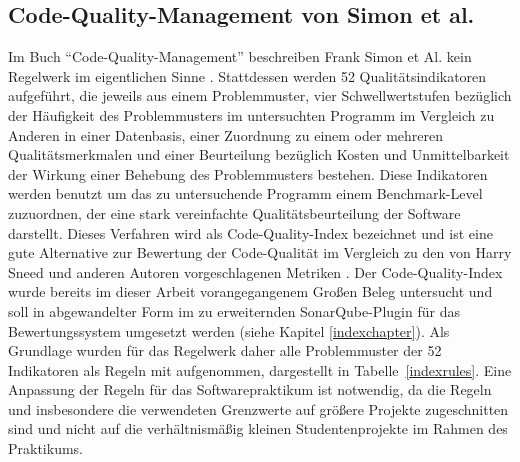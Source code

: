\documentclass[da,ngerman]{stthesis}
\begin{document}
			\subsection{Code-Quality-Management von Simon et al.}
				Im Buch "`Code-Quality-Management"' beschreiben Frank Simon et Al. kein Regelwerk im eigentlichen Sinne \cite{CodeQualityManagement}. Stattdessen werden 52 Qualitätsindikatoren aufgeführt, die jeweils aus einem Problemmuster, vier Schwellwertstufen bezüglich der Häufigkeit des Problemmusters im untersuchten Programm im Vergleich zu Anderen in einer Datenbasis, einer Zuordnung zu einem oder mehreren Qualitätsmerkmalen und einer Beurteilung bezüglich Kosten und Unmittelbarkeit der Wirkung einer Behebung des Problemmusters bestehen. Diese Indikatoren werden benutzt um das zu untersuchende Programm einem Benchmark-Level zuzuordnen, der eine stark vereinfachte Qualitätsbeurteilung der Software darstellt. Dieses Verfahren wird als Code-Quality-Index bezeichnet und ist eine gute Alternative zur Bewertung der Code-Qualität im Vergleich zu den von Harry Sneed und anderen Autoren vorgeschlagenen Metriken \cite{SoftwareInZahlen}. \newline
				Der Code-Quality-Index wurde bereits im dieser Arbeit vorangegangenem Großen Beleg untersucht \cite{grosserBeleg} und soll in abgewandelter Form im zu erweiternden SonarQube-Plugin für das Bewertungssystem umgesetzt werden (siehe Kapitel \ref{indexchapter}). Als Grundlage wurden für das Regelwerk daher alle Problemmuster der 52 Indikatoren als Regeln mit aufgenommen, dargestellt in Tabelle~\ref{indexrules}. Eine Anpassung der Regeln für das Softwarepraktikum ist notwendig, da die Regeln und insbesondere die verwendeten Grenzwerte auf größere Projekte zugeschnitten sind und nicht auf die verhältnismäßig kleinen Studentenprojekte im Rahmen des Praktikums. 
\end{document}
